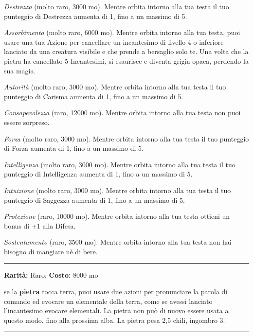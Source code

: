 \begin{multicols}{2}
\emph{Destrezza} (molto raro, 3000 mo). Mentre orbita intorno alla tua testa il tuo punteggio di Destrezza aumenta di 1, fino a un massimo di 5.

\emph{Assorbimento} (molto raro, 6000 mo). Mentre orbita intorno alla tua testa, puoi usare una tua Azione per cancellare un incantesimo di livello 4 o inferiore lanciato da una creatura visibile e che prende a bersaglio solo te. Una volta che la pietra ha cancellato 5 Incantesimi, si esaurisce e diventa grigia opaca, perdendo la sua magia.

\emph{Autorità} (molto raro, 3000 mo). Mentre orbita intorno alla tua testa il tuo punteggio di Carisma aumenta di 1, fino a un massimo di 5.

\emph{Consapevolezza} (raro, 12000 mo). Mentre orbita intorno alla tua testa non puoi essere sorpreso.

\emph{Forza} (molto raro, 3000 mo). Mentre orbita intorno alla tua testa il tuo punteggio di Forza aumenta di 1, fino a un massimo di 5.

\emph{Intelligenza} (molto raro, 3000 mo). Mentre orbita intorno alla tua testa il tuo punteggio di Intelligenza aumenta di 1, fino a un massimo di 5.

\emph{Intuizione} (molto raro, 3000 mo). Mentre orbita intorno alla tua testa il tuo punteggio di Saggezza aumenta di 1, fino a un massimo di 5.

\emph{Protezione} (raro, 10000 mo). Mentre orbita intorno alla tua testa ottieni un bonus di +1 alla Difesa.

\emph{Sostentamento} (raro, 3500 mo). Mentre orbita intorno alla tua testa non hai bisogno di mangiare né di bere.

\smallskip\noindent\rule{\linewidth}{2pt}  \hypertarget{PietradegliElementalidellaTerra}{}\medskip{}\noindent\label{PietradegliElementalidellaTerra}

\textbf{Rarità:} Raro; \textbf{Costo:} 8000 mo

se la \textbf{pietra} tocca terra, puoi usare due azioni per pronunciare la parola di comando ed evocare un elementale della terra, come se avessi lanciato l'incantesimo evocare elementali. La pietra non può di nuovo essere usata a questo modo, fino alla prossima alba. La pietra pesa 2,5 chili, ingombro 3.

\smallskip\noindent\rule{\linewidth}{2pt}  \hypertarget{PietradelPeso}{}\medskip{}\noindent\label{PietradelPeso}


\end{multicols}
